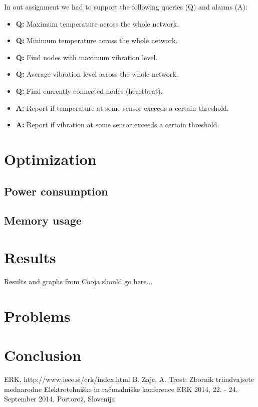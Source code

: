 \documentclass[a4paper]{article}
\begin{document}
In out assignment we had to support the following queries (Q) and alarms (A):
\begin{itemize}
\item \textbf{Q:} Maximum temperature across the whole network.
\item \textbf{Q:} Minimum temperature across the whole network.
\item \textbf{Q:} Find nodes with maximum vibration level.
\item \textbf{Q:} Average vibration level across the whole network.
\item \textbf{Q:} Find currently connected nodes (heartbeat).
\item \textbf{A:} Report if temperature at some sensor exceeds a certain threshold.
\item \textbf{A:} Report if vibration at some sensor exceeds a certain threshold.
\end{itemize}
\section{Optimization}
\subsection{Power consumption}
\subsection{Memory usage}
\section{Results}
Results and graphs from Cooja should go here...
\section{Problems}
\section{Conclusion}
\small
\begin{thebibliography}{1}

 ERK, http://www.ieee.si/erk/index.html 
 B. Zajc, A. Trost: Zbornik triindvajsete mednarodne Elektrotehniške in računalniške konference ERK 2014, 22. - 24. September 2014, Portorož, Slovenija

\end{thebibliography}
\end{document}
